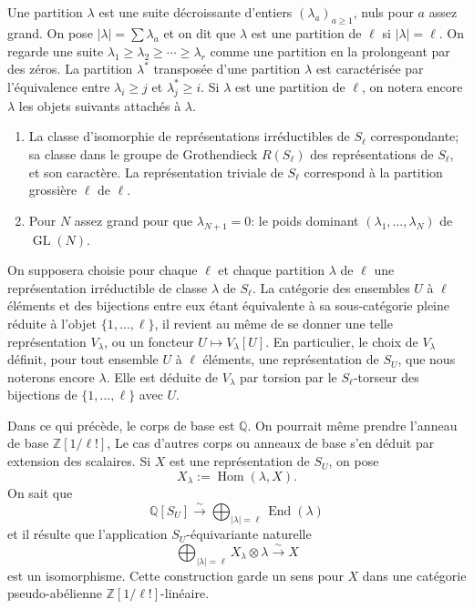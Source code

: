 \documentclass[11pt,a4paper]{article}
\theoremstyle{plain}
\theoremstyle{definition}
\DeclareMathOperator{\Hom}{Hom}
\DeclareMathOperator{\End}{End}
\DeclareMathOperator{\GL}{GL}
\newcommand{\Z}{\mathbb{Z}}
\newcommand{\Q}{\mathbb{Q}}
\newcommand{\isom}{\xrightarrow{\sim}}
\begin{document}
\subsection{}
Une partition $\lambda$ est une suite d\'ecroissante d'entiers $(\lambda_a)_{a \geq 1}$, nuls pour $a$ assez grand. On pose $|\lambda| = \sum \lambda_a$ et on dit que $\lambda$ est une partition de $\ell$ si $|\lambda| = \ell$. On regarde une suite $\lambda_1 \geq \lambda_2 \geq \cdots \geq \lambda_r$ comme une partition en la prolongeant par des z\'eros. La partition $\lambda^*$ transpos\'ee d'une partition $\lambda$ est caract\'eris\'ee par l'\'equivalence entre $\lambda_i \geq j$ et $\lambda^*_j \geq i$. Si $\lambda$ est une partition de $\ell$, on notera encore $\lambda$ les objets suivants attach\'es \`a $\lambda$.
\begin{enumerate}[label=(\Alph*)]
\item La classe d'isomorphie de repr\'esentations irr\'eductibles de $S_\ell$ correspondante; sa classe dans le groupe de Grothendieck $R(S_\ell)$ des repr\'esentations de $S_\ell$, et son caract\`ere. La repr\'esentation triviale de $S_\ell$ correspond \`a la partition grossi\`ere $\ell$ de $\ell$.
\item Pour $N$ assez grand pour que $\lambda_{N+1} = 0$: le poids dominant $(\lambda_1, \ldots, \lambda_N)$ de $\GL(N)$.
\end{enumerate}

On supposera choisie pour chaque $\ell$ et chaque partition $\lambda$ de $\ell$ une repr\'esentation irr\'eductible de classe $\lambda$ de $S_\ell$. La cat\'egorie des ensembles $U$ \`a $\ell$ \'el\'ements et des bijections entre eux \'etant \'equivalente \`a sa sous-cat\'egorie pleine r\'eduite \`a l'objet $\{1, \ldots, \ell\}$, il revient au m\^eme de se donner une telle repr\'esentation $V_\lambda$, ou un foncteur $U \mapsto V_\lambda[U]$. En particulier, le choix de $V_\lambda$ d\'efinit, pour tout ensemble $U$ \`a $\ell$ \'el\'ements, une repr\'esentation de $S_U$, que nous noterons encore $\lambda$. Elle est d\'eduite de $V_\lambda$ par torsion par le $S_\ell$-torseur des bijections de $\{1, \ldots, \ell\}$ avec $U$.

Dans ce qui pr\'ec\`ede, le corps de base est $\Q$. On pourrait m\^eme prendre l'anneau de base $\Z[1/\ell!]$, Le cas d'autres corps ou anneaux de base s'en d\'eduit par extension des scalaires. Si $X$ est une repr\'esentation de $S_U$, on pose
\begin{equation}
X_\lambda := \Hom(\lambda, X). \tag{1.10.1}
\end{equation}
On sait que
\begin{equation}
\Q[S_U] \isom \bigoplus_{|\lambda| = \ell} \End(\lambda) \tag{1.10.2}
\end{equation}
et il r\'esulte que l'application $S_U$-\'equivariante naturelle
\begin{equation}
\bigoplus_{|\lambda| = \ell} X_\lambda \otimes \lambda \isom X \tag{1.10.3}
\end{equation}
est un isomorphisme. Cette construction garde un sens pour $X$ dans une cat\'egorie pseudo-ab\'elienne $\Z[1/\ell!]$-lin\'eaire.
\end{document}

